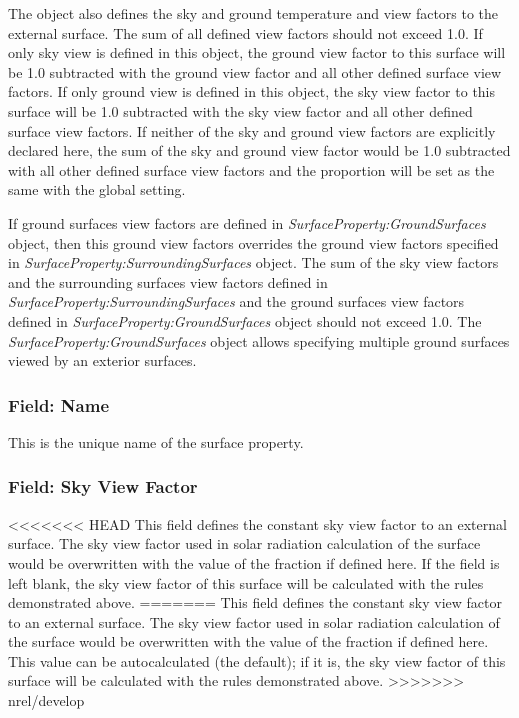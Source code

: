 The object also defines the sky and ground temperature and view factors to the external surface. The sum of all defined view factors should not exceed 1.0. If only sky view is defined in this object, the ground view factor to this surface will be 1.0 subtracted with the ground view factor and all other defined surface view factors. If only ground view is defined in this object, the sky view factor to this surface will be 1.0 subtracted with the sky view factor and all other defined surface view factors. If neither of the sky and ground view factors are explicitly declared here, the sum of the sky and ground view factor would be 1.0 subtracted with all other defined surface view factors and the proportion will be set as the same with the global setting.

If ground surfaces view factors are defined in \textit{SurfaceProperty:GroundSurfaces} object, then this ground view factors overrides the ground view factors specified in \textit{SurfaceProperty:SurroundingSurfaces} object. The sum of the sky view factors and the surrounding surfaces view factors defined in \textit{SurfaceProperty:SurroundingSurfaces} and the ground surfaces view factors defined in \textit{SurfaceProperty:GroundSurfaces} object should not exceed 1.0. The \textit{SurfaceProperty:GroundSurfaces} object allows specifying multiple ground surfaces viewed by an exterior surfaces.

\subsubsection{Field: Name}\label{field-srd-surfs-name}

This is the unique name of the surface property.

\subsubsection{Field: Sky View Factor}\label{field-sky-view-factor}

<<<<<<< HEAD
This field defines the constant sky view factor to an external surface. The sky view factor used in solar radiation calculation of the surface would be overwritten with the value of the fraction if defined here. If the field is left blank, the sky view factor of this surface will be calculated with the rules demonstrated above.
=======
This field defines the constant sky view factor to an external surface. The sky view factor used in solar radiation calculation of the surface would be overwritten with the value of the fraction if defined here. This value can be autocalculated (the default); if it is, the sky view factor of this surface will be calculated with the rules demonstrated above.
>>>>>>> nrel/develop

